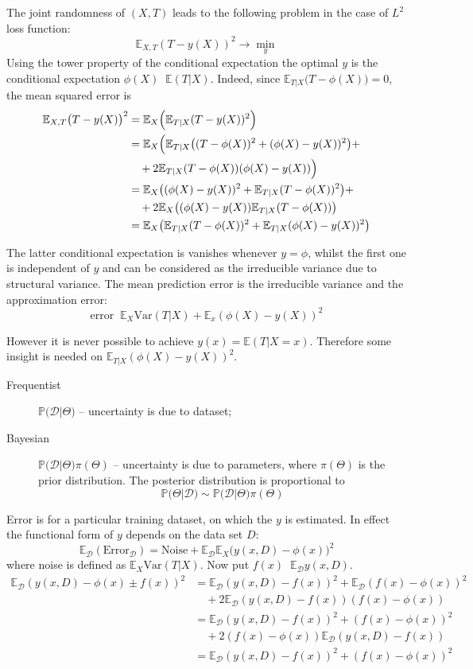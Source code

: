 \documentclass[a4paper]{article}
\newcommand{\Dcal}{\mathcal{D}}
\newcommand{\Ex}[0]{{\mathbb{E}}}
\newcommand{\pr}[0]{{\mathbb{P}}}
\newcommand{\Var}[0]{{\text{Var}}}
\newcommand{\defn}{\mathop{\overset{\Delta}{=}}\nolimits}
\begin{document}
The joint randomness of $(X,T)$ leads to the following problem in the case of
$L^2$ loss function:
\[\Ex_{X,T} (T-y(X))^2 \to \min_y\]
Using the tower property of the conditional expectation the optimal $y$ is the
conditional expectation $\phi(X)\defn \Ex(T\rvert X)$. Indeed, since
$\Ex_{T\rvert X} \bigl(T-\phi(X) \bigr) = 0$, the mean squared error is
\begin{align*}
	\Ex_{X,T} \bigl(T-y(X)\bigr)^2 &= \Ex_{X} \Bigl( \Ex_{T\rvert X} (T-y(X))^2 \Bigr) \\
		&= \Ex_X \Bigl( \Ex_{T\rvert X} \bigl( (T-\phi(X))^2+(\phi(X)-y(X))^2 \bigr) + \\
			&\quad + 2 \Ex_{T\rvert X} (T-\phi(X))(\phi(X)-y(X)) \Bigr) \\
		&= \Ex_X \bigl( (\phi(X)-y(X))^2 + \Ex_{T\rvert X} (T-\phi(X))^2 \bigr) + \\
			&\quad + 2 \Ex_X \bigl((\phi(X)-y(X)) \Ex_{T\rvert X} (T-\phi(X)) \bigr) \\
		&= \Ex_X \bigl( \Ex_{T\rvert X} (T-\phi(X))^2 + \Ex_{T\rvert X} (\phi(X)-y(X))^2 \bigr)
\end{align*}

The latter conditional expectation is vanishes whenever $y=\phi$, whilst the first
one is independent of $y$ and can be considered as the irreducible variance due
to structural variance. The mean prediction error is the irreducible variance and
the approximation error:
\[\text{error} \defn \Ex_X \Var(T\rvert X) + \Ex_x (\phi(X)-y(X))^2 \]

However it is never possible to achieve $y(x) = \Ex(T\rvert X=x)$.
Therefore some insight is needed on $\Ex_{T\rvert X} (\phi(X)-y(X))^2$.
\begin{description}
	\item[Frequentist] $\pr\bigl(\Dcal\rvert \Theta\bigr)$ -- uncertainty is due
	to dataset;
	\item[Bayesian] $\pr\bigl(\Dcal\rvert \Theta\bigr) \pi(\Theta)$ -- uncertainty
	is due to parameters, where $\pi(\Theta)$ is the prior distribution. The posterior
	distribution is proportional to
		\[\pr\bigl(\Theta\rvert \Dcal\bigr) \sim \pr\bigl(\Dcal\rvert \Theta\bigr) \pi(\Theta)\]
\end{description}

Error is for a particular training dataset, on which the $y$ is estimated. In effect
the functional form of $y$ depends on the data set $D$:
\[\Ex_\Dcal(\text{Error}_\Dcal) = \text{Noise} + \Ex_\Dcal \Ex_X \bigl( y(x,D)-\phi(x) \bigr)^2\]
where noise is defined as $\Ex_X \Var(T\rvert X)$.
Now put $f(x) \defn \Ex_\Dcal y(x,D)$.
\begin{align*}
	\Ex_\Dcal( y(x,D)-\phi(x) \pm f(x) )^2
		& = \Ex_\Dcal( y(x,D) - f(x) )^2 + \Ex_\Dcal( f(x) - \phi(x) )^2 \\
			&\quad + 2 \Ex_\Dcal( y(x,D) - f(x) )( f(x) - \phi(x) ) \\
		& = \Ex_\Dcal( y(x,D) - f(x) )^2 + ( f(x) - \phi(x) )^2 \\
			&\quad + 2( f(x) - \phi(x) ) \Ex_\Dcal( y(x,D) - f(x) ) \\
		& = \Ex_\Dcal( y(x,D) - f(x) )^2 + ( f(x) - \phi(x) )^2 \\
\end{align*}
\end{document}
